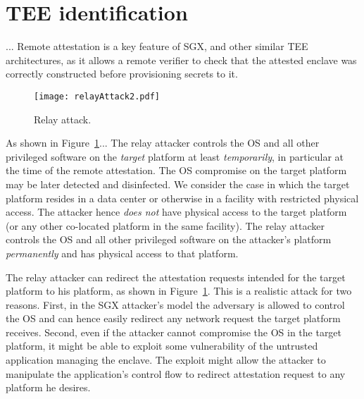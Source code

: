 
\section*{TEE identification}

\cite{proximitee}...
Remote attestation is a key feature of SGX, and other similar TEE architectures, as it allows a remote verifier to check that the attested enclave was correctly constructed before provisioning secrets to it. 

\begin{figure}[t]
	\centering
	\texttt{[image: relayAttack2.pdf]}
	\caption{Relay attack.}
	\label{fig:SystemModel}
\end{figure}

As shown in Figure~\ref{fig:SystemModel}... The relay attacker controls the OS and all other privileged software on the \emph{target} platform at least \emph{temporarily}, in particular at the time of the remote attestation. The OS compromise on the target platform may be later detected and disinfected. We consider the case in which the target platform resides in a data center or otherwise in a facility with restricted physical access. The attacker hence \emph{does not} have physical access to the target platform (or any other co-located platform in the same facility).
The relay attacker controls the OS and all other privileged software on the attacker's platform \emph{permanently} and has physical access to that platform. 

The relay attacker can redirect the attestation requests intended for the target platform to his platform, as shown in Figure~\ref{fig:SystemModel}. This is a realistic attack for two reasons. First, in the SGX attacker's model the adversary is allowed to control the OS and can hence easily redirect any network request the target platform receives. Second, even if the attacker cannot compromise the OS in the target platform, it might be able to exploit some vulnerability of the untrusted application managing the enclave. The exploit might allow the attacker to manipulate the application's control flow to redirect attestation request to any platform he desires.



